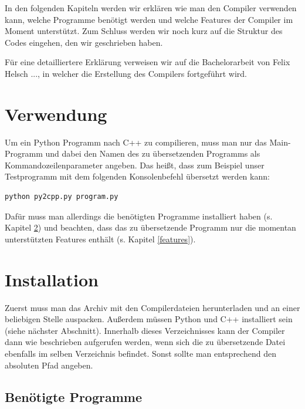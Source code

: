 

In den folgenden Kapiteln werden wir erklären wie man den Compiler verwenden kann, welche Programme benötigt werden und welche Features der Compiler im Moment unterstützt. Zum Schluss werden wir noch kurz auf die Struktur des Codes eingehen, den wir geschrieben haben.

Für eine detailliertere Erklärung verweisen wir auf die Bachelorarbeit von Felix Helsch ..., in welcher die Erstellung des Compilers fortgeführt wird.



\section{Verwendung}

Um ein Python Programm nach C++ zu compilieren, muss man nur das Main-Programm  und dabei den Namen des zu übersetzenden Programms als Kommandozeilenparameter angeben. Das heißt, dass zum Beispiel unser Testprogramm  mit dem folgenden Konsolenbefehl übersetzt werden kann:
\begin{lstlisting}
python py2cpp.py program.py
\end{lstlisting}
Dafür muss man allerdings die benötigten Programme installiert haben (s. Kapitel \ref{progs}) und beachten, dass das zu übersetzende Programm nur die momentan unterstützten Features enthält (s. Kapitel \ref{features}).
\enlargethispage{1cm}

\section{Installation} \label{progs}

Zuerst muss man das Archiv mit den Compilerdateien herunterladen \cite{py2cpp} und an einer beliebigen Stelle auspacken.
Außerdem müssen Python und C++ installiert sein (siehe nächster Abschnitt).
Innerhalb dieses Verzeichnisses kann der Compiler dann wie beschrieben aufgerufen werden, wenn sich die zu übersetzende Datei ebenfalls im selben Verzeichnis befindet.
Sonst sollte man entsprechend den absoluten Pfad angeben.


\subsection{Benötigte Programme}

